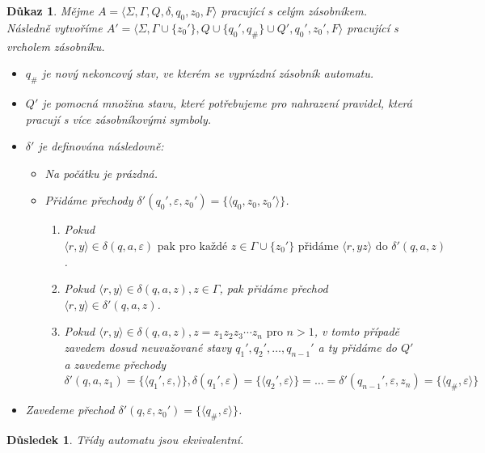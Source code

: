 \documentclass[10pt, a4paper, titlepage]{article}
\theoremstyle{note}
\newtheorem{dukaz}{Důkaz}
\newtheorem{dusledek}{Důsledek}
\begin{document}
\begin{dukaz}
Mějme $A = \langle \Sigma, \Gamma, Q, \delta, q_0, z_0, F \rangle$ pracující s celým zásobníkem. Následně vytvoříme
$A' = \langle \Sigma, \Gamma \cup \lbrace z_0' \rbrace, Q \cup \lbrace q_0', q_\# \rbrace \cup Q', q_0', z_0', F \rangle$ pracující s vrcholem
zásobníku.
\begin{itemize}
\item
$q_\#$ je nový nekoncový stav, ve kterém se vyprázdní zásobník automatu.

\item
$Q'$ je pomocná množina stavu, které potřebujeme pro nahrazení pravidel, která pracují s více zásobníkovými symboly.

\item
$\delta'$ je definována následovně:
\begin{itemize}
\item
Na počátku je prázdná.

\item
Přidáme přechody $\delta'(q_0', \varepsilon, z_0') = \lbrace \langle q_0, z_0, z_0' \rangle \rbrace$.
\begin{enumerate}
\item
Pokud $\langle r, y \rangle \in \delta(q, a, \varepsilon) \text{ pak pro každé } z \in \Gamma \cup \lbrace z_0' \rbrace \text{ přidáme }
\langle r, yz \rangle \text{ do } \delta'(q, a, z)$.

\item
Pokud $\langle r, y \rangle \in \delta(q, a, z), z \in \Gamma$, pak přidáme přechod $\langle r, y \rangle \in \delta'(q, a, z)$.

\item
Pokud $\langle r, y \rangle \in \delta(q, a, z), z = z_1z_2z_3 \cdots z_n \text{ pro } n > 1$, v tomto případě zavedem dosud neuvažované stavy
$q_1',q_2',\ldots,q_{n-1}'$ a ty přidáme do $Q'$ a zavedeme přechody $\delta'(q, a, z_1) = \lbrace \langle q_1', \varepsilon, \rangle \rbrace,
\delta(q_1', \varepsilon) = \lbrace \langle q_2', \varepsilon \rangle \rbrace = \ldots = \delta'(q_{n-1}', \varepsilon, z_n) =
\lbrace \langle q_\#, \varepsilon \rangle \rbrace$
\end{enumerate}
\end{itemize}

\item
Zavedeme přechod $\delta'(q, \varepsilon, z_0') = \lbrace \langle q_\#, \varepsilon \rangle \rbrace$.
\end{itemize}
\end{dukaz}
\begin{dusledek}
Třídy automatu jsou ekvivalentní.
\end{dusledek}
\end{document}

